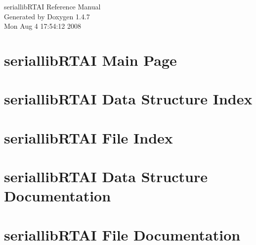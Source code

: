\documentclass[a4paper]{book}
\begin{document}
\begin{titlepage}
\vspace*{7cm}
\begin{center}
{\Large seriallib\-RTAI Reference Manual}\\
\vspace*{1cm}
{\large Generated by Doxygen 1.4.7}\\
\vspace*{0.5cm}
{\small Mon Aug 4 17:54:12 2008}\\
\end{center}
\end{titlepage}
\clearemptydoublepage
{}
\tableofcontents
\clearemptydoublepage
{}
\chapter{seriallib\-RTAI Main Page}
\label{index}
\chapter{seriallib\-RTAI Data Structure Index}

\chapter{seriallib\-RTAI File Index}

\chapter{seriallib\-RTAI Data Structure Documentation}

\chapter{seriallib\-RTAI File Documentation}


\printindex
\end{document}
